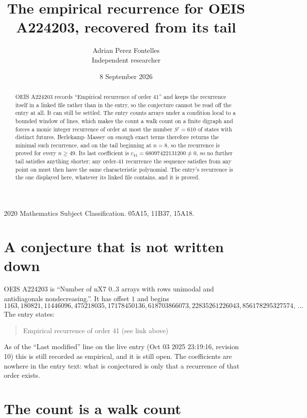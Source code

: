 \documentclass[11pt,a4paper]{article}
\title{The empirical recurrence for OEIS A224203, recovered from its tail}
\author{Adrian Perez Fontelles\\ \small Independent researcher}
\date{8 September 2026}
\theoremstyle{plain}
\theoremstyle{definition}
\begin{document}
\maketitle

\begin{abstract}
OEIS A224203 records ``Empirical recurrence of order $41$'' and keeps the recurrence itself in
a linked file rather than in the entry, so the conjecture cannot be read off the entry at all.
It can still be settled. The entry counts arrays under a condition local to a bounded window of
lines, which makes the count a walk count on a finite digraph and forces a monic integer
recurrence of order at most the number $S'=610$ of states with distinct futures. Berlekamp--Massey on
enough exact terms therefore returns the minimal such recurrence, and on the tail beginning at $n=8$, so the recurrence is proved for every $n\ge49$.
Its last coefficient is $c_{41}=68097422131200\neq0$, so no further tail satisfies anything
shorter; any order-$41$ recurrence the sequence satisfies from any point on must then have
the same characteristic polynomial. The entry's recurrence is the one displayed here, whatever
its linked file contains, and it is proved.
\end{abstract}

\noindent\small 2020 Mathematics Subject Classification. 05A15, 11B37, 15A18.\normalsize

\section{A conjecture that is not written down}

OEIS A224203 is ``Number of nX7 0..3 arrays with rows unimodal and antidiagonals nondecreasing.''. It has offset $1$ and begins
\[
1163, 180821, 11446096, 475218035, 17178450136, 618703866073, 22835261226043, 856178295327574,\ \dots
\]
The entry states:
\begin{quote}
Empirical recurrence of order 41 (see link above)
\end{quote}
As of the ``Last modified'' line on the live entry (Oct 03 2025 23:19:16, revision 10)
this is still recorded as empirical, and it is still open. The coefficients are nowhere in the
entry text: what is conjectured is only that a recurrence of that order exists.

\section{The count is a walk count}
\end{document}
